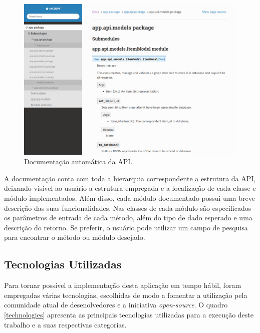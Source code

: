 \documentclass[12pt, openright, oneside, a4paper, brazil]{abntex2}
\begin{document}
\begin{figure}[h!tp]
	\caption{\label{docs}Documentação automática da API.}
	\begin{center}
		\includegraphics[scale=0.55]{images/docs.png}
	\end{center}
	\hspace{5.5cm}{Fonte: O Autor.}
\end{figure}

A documentação conta com toda a hierarquia correspondente a estrutura da API, deixando visível ao usuário a estrutura empregada e a localização de cada classe e módulo implementados. Além disso, cada módulo documentado possui uma breve descrição das suas funcionalidades. Nas classes de cada módulo são especificados os parâmetros de entrada de cada método, além do tipo de dado esperado e uma descrição do retorno. Se preferir, o usuário pode utilizar um campo de pesquisa para encontrar o método ou módulo desejado.

\subsection{Tecnologias Utilizadas} \label{tecnologias}

Para tornar possível a implementação desta aplicação em tempo hábil, foram empregadas várias tecnologias, escolhidas de modo a fomentar a utilização pela comunidade atual de desenolvedores e a iniciativa \textit{open-source}. O quadro \ref{technologies} apresenta as principais tecnologias utilizadas para a execução deste trabalho e a suas respectivas categorias.
\end{document}
